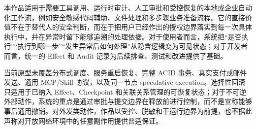 本作品适用于需要工具调用、运行时审计、人工审批和受控恢复的本地或企业自动化工作流，例如安全敏感代码辅助、文件处理和多步骤业务准备流程。它的直接价值不在于替代人的安全判断，而在于把用户已经作出的授权边界落实到每一次具体执行中，并在异常时留下能够追溯的处理依据。对于使用者而言，系统把“是否执行”“执行到哪一步”“发生异常后如何处理”从隐含逻辑变为可见状态；对于开发者而言，统一的 Effect 和 Audit 记录为后续排查、测试和改进提供了基础。

当前原型未覆盖分布式调度、服务重启恢复、完整 ACID 事务、真实支付或邮件发送、通用 MCP/Skill 协议，以及同一节点 speculative execution。选择性回滚只适用于已纳入 Effect、Checkpoint 和关联关系管理的可恢复状态；对于不可逆外部动作，系统的重点是通过审批与提交边界在释放前进行控制，而不是宣称能够事后通用撤销。对外发类动作，作品以受控、脱敏和干运行边界为前提，也不据此声称对开放网络环境中的任意副作用提供普适保证。
